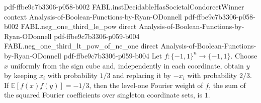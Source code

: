 \begin{theorem}
{    pdf-ffbe9c7b3306-p058-b002}
\proofstep
  {FABL.instDecidableHasSocietalCondorcetWinner}
  {context}
  {Analysis-of-Boolean-Functions-by-Ryan-ODonnell}
  {pdf-ffbe9c7b3306-p058-b002}
\proofstep
  {FABL.neg_one_third_le_pow}
  {direct}
  {Analysis-of-Boolean-Functions-by-Ryan-ODonnell}
  {pdf-ffbe9c7b3306-p059-b004}
\proofstep
  {FABL.neg_one_third_lt_pow_of_ne_one}
  {direct}
  {Analysis-of-Boolean-Functions-by-Ryan-ODonnell}
  {pdf-ffbe9c7b3306-p059-b004}
Let $f:\{-1,1\}^n\to\{-1,1\}$. Choose $x$ uniformly from the sign cube and,
independently in each coordinate, obtain $y$ by keeping $x_i$ with probability $1/3$ and
replacing it by $-x_i$ with probability $2/3$. If $\mathbb E[f(x)f(y)]=-1/3$, then the
level-one Fourier weight of $f$, the sum of the squared Fourier coefficients over
singleton coordinate sets, is $1$.
\end{theorem}

